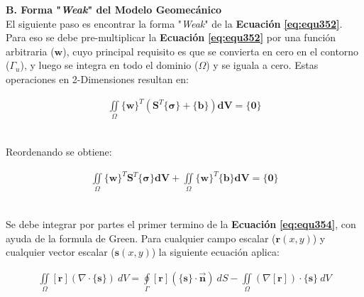 \textbf{B. Forma "\textit{Weak}" del Modelo Geomecánico}\\
El siguiente paso es encontrar la forma "\textit{Weak}" de la \textbf{Ecuación} \textbf{\ref{eq:equ352}}. Para eso se debe pre-multiplicar la \textbf{Ecuación} \textbf{\ref{eq:equ352}} por una función arbitraria ($\mathbf{w}$), cuyo principal requisito es que se convierta en cero en el contorno ($\Gamma_{u}$), y luego se integra en todo el dominio ($\Omega$) y se iguala a cero. Estas operaciones en 2-Dimensiones resultan en:


\begin{ceqn} %
\begin{gather}\label{eq:equ353}
\iint \limits_\Omega \{\mathbf{w}\}^T \left(\mathbf{S}^T\{\mathbf{\sigma}\} + \{\mathbf{b}\}\right)\mathbf{dV} = \{\mathbf{0}\}
\end{gather}   
\end{ceqn}
\\
Reordenando se obtiene:

\begin{ceqn} %
\begin{gather}\label{eq:equ354}
\iint \limits_\Omega \{\mathbf{w}\}^T \mathbf{S}^T\{\mathbf{\sigma}\} \mathbf{dV}+ 
\iint \limits_\Omega \{\mathbf{w}\}^T \{\mathbf{b}\} \mathbf{dV} = \{\mathbf{0}\}
\end{gather}   
\end{ceqn}
\\
Se debe integrar por partes el primer termino de la  \textbf{Ecuación} \textbf{\ref{eq:equ354}}, con ayuda de la formula de Green. Para cualquier campo escalar ($\mathbf{r}(x,y)$) y cualquier vector escalar ($\mathbf{s}(x,y)$) la siguiente ecuación aplica:

\begin{ceqn} %
\begin{gather}\label{eq:equ355}
\iint \limits_\Omega [\mathbf{r}](\nabla \cdot \{\mathbf{s}\})\ dV = 
\oint \limits_\Gamma [\mathbf{r}](\{\mathbf{s}\} \cdot \mathbf{\vec{n}})\ dS -
\iint \limits_\Omega (\nabla [\mathbf{r}]) \cdot \{\mathbf{s}\}\ dV
\end{gather}   
\end{ceqn}

